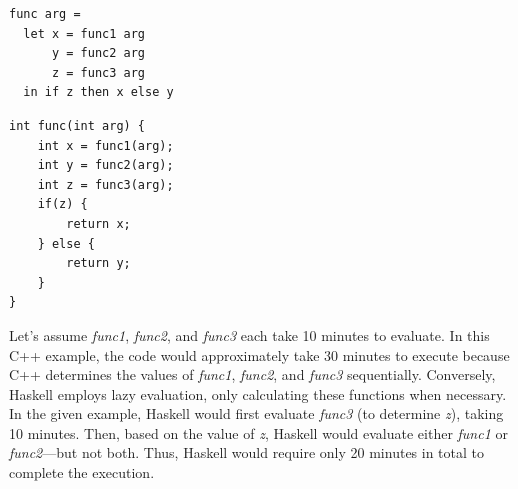 \documentclass[a4paper, 10pt]{article}
\begin{document}
        \begin{minipage}[t]{0.45\textwidth}
            \lstset{language=Haskell}
            \begin{lstlisting}
func arg =
  let x = func1 arg
      y = func2 arg
      z = func3 arg
  in if z then x else y
            \end{lstlisting}
        \end{minipage}
        \hfill
        \begin{minipage}[t]{0.45\textwidth}
            \centering
            \vspace*{3mm}
            \lstset{language=C++}
            \begin{lstlisting}
int func(int arg) {
    int x = func1(arg);
    int y = func2(arg);
    int z = func3(arg);
    if(z) {
        return x;
    } else {
        return y;
    }
}
            \end{lstlisting}
        \end{minipage}

    \vspace*{3mm}
    \noindent Let's assume \textit{func1}, \textit{func2}, and \textit{func3} each take 10 minutes to evaluate. In this C++ example, the code would approximately take 30 minutes to execute because C++ determines the values of \textit{func1}, \textit{func2}, and \textit{func3} sequentially. Conversely, Haskell employs lazy evaluation, only calculating these functions when necessary. In the given example, Haskell would first evaluate \textit{func3} (to determine \textit{z}), taking 10 minutes. Then, based on the value of \textit{z}, Haskell would evaluate either \textit{func1} or \textit{func2}—but not both. Thus, Haskell would require only 20 minutes in total to complete the execution.
\end{document}
